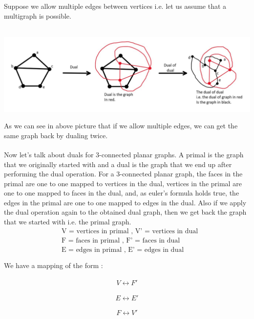 \documentclass{article}
\begin{document}
    \\\\
    Suppose we allow multiple edges between vertices i.e. let us assume that a multigraph is possible.
    \\\\
    \centerline{\includegraphics[width=6in]{Images/dual_2.JPG}}
    As we can see in above picture that if we allow multiple edges, we can get the same graph back by dualing twice.
    \\\\
    Now let's talk about duals for 3-connected planar graphs. A primal is the graph that we originally started with and a dual is the graph that we end up after performing the dual operation. For a 3-connected planar graph, the faces in the primal are one to one mapped to vertices in the dual, vertices in the primal are one to one mapped to faces in the dual, and, as euler's formula holds true, the edges in the primal are one to one mapped to edges in the dual. Also if we apply the dual operation again to the obtained dual graph, then we get back the graph that we started with i.e. the primal graph.
    \begin{align*}
        &\text{V = vertices in primal ,  V' = vertices in dual} \\
        &\text{F = faces in primal ,  F' = faces in dual} \\
        &\text{E = edges in primal ,    E' = edges in dual }\\\\
        \end{align*}
        We have a mapping of the form : \\\\
        \begin{equation}V \leftrightarrow F'     \end{equation}\\
        \begin{equation} E \leftrightarrow E' \end{equation} \\
        \begin{equation} F \leftrightarrow V' \end{equation}
\end{document}
